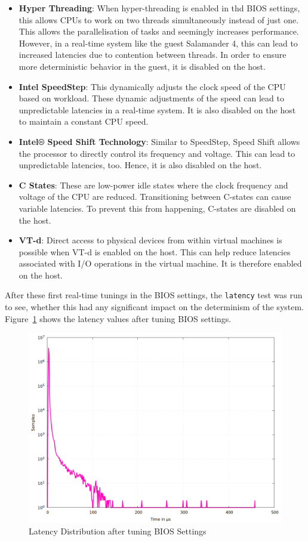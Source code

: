 \documentclass[MMR,Master,english]{twbook}
\begin{document}
\begin{itemize}
	\item \textbf{Hyper Threading}: When hyper-threading is enabled in thd BIOS settings, this allows CPUs to work on two threads simultaneously instead of just one. This allows the parallelisation of tasks and seemingly increases performance. However, in a real-time system like the guest Salamander 4, this can lead to increased latencies due to contention between threads. In order to ensure more deterministic behavior in the guest, it is disabled on the host.
	\item \textbf{Intel SpeedStep}: This dynamically adjusts the clock speed of the CPU based on workload. These dynamic adjustments of the speed can lead to unpredictable latencies in a real-time system. It is also disabled on the host to maintain a constant CPU speed. 
	\item \textbf{Intel® Speed Shift Technology}: Similar to SpeedStep, Speed Shift allows the processor to directly control its frequency and voltage. This can lead to unpredictable latencies, too. Hence, it is also disabled on the host.
	\item \textbf{C States}: These are low-power idle states where the clock frequency and voltage of the CPU are reduced. Transitioning between C-states can cause variable latencies. To prevent this from happening, C-states are disabled on the host.
	\item \textbf{VT-d}: Direct access to physical devices from within virtual machines is possible when VT-d is enabled on the host. This can help reduce latencies associated with I/O operations in the virtual machine. It is therefore enabled on the host.
\end{itemize}

\noindent After these first real-time tunings in the BIOS settings, the \texttt{latency} test was run to see, whether this had any significant impact on the determinism of the system. Figure~\ref{fig:gnuplot_max_latency_taskset} shows the latency values after tuning BIOS settings.

\begin{figure}[H]
	\centering
	\includegraphics[width=0.7\columnwidth]{masterthesis-documentation/docs/sigmatek/xenomai/2taskset/gnuplot_max_latency_taskset.png}
	\caption[Latency Distribution after tuning BIOS Settings]{Latency Distribution after tuning BIOS Settings}
	\label{fig:gnuplot_max_latency_taskset}
\end{figure}
\end{document}

